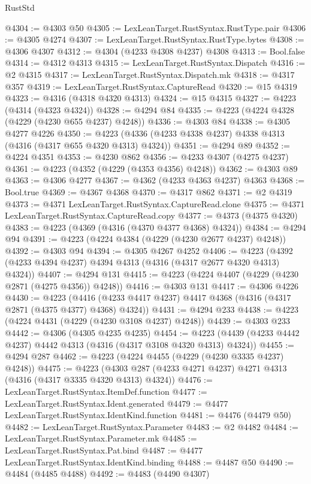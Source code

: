 \begin{lexlean}{RustStd}
\begin{coremodule}
@4304 := @4303 @50
@4305 := LexLeanTarget.RustSyntax.RustType.pair
@4306 := @4305 @4274
@4307 := LexLeanTarget.RustSyntax.RustType.bytes
@4308 := @4306 @4307
@4312 := @4304 (@4233 @4308 @4237) @4308
@4313 := Bool.false
@4314 := @4312 @4313
@4315 := LexLeanTarget.RustSyntax.Dispatch
@4316 := @2 @4315
@4317 := LexLeanTarget.RustSyntax.Dispatch.mk
@4318 := @4317 @357
@4319 := LexLeanTarget.RustSyntax.CaptureRead
@4320 := @15 @4319
@4323 := @4316 (@4318 @4320 @4313)
@4324 := @15 @4315
@4327 := @4223 (@4314 (@4323 @4324))
@4328 := @4294 @84
@4335 := @4223 (@4224 @4328 (@4229 (@4230 @655 @4237) @4248))
@4336 := @4303 @84
@4338 := @4305 @4277 @4226
@4350 := @4223 (@4336 (@4233 @4338 @4237) @4338 @4313 (@4316 (@4317 @655 @4320 @4313) @4324))
@4351 := @4294 @89
@4352 := @4224 @4351
@4353 := @4230 @862
@4356 := @4233 @4307 (@4275 @4237)
@4361 := @4223 (@4352 (@4229 (@4353 @4356) @4248))
@4362 := @4303 @89
@4363 := @4306 @4277
@4367 := @4362 (@4233 @4363 @4237) @4363
@4368 := Bool.true
@4369 := @4367 @4368
@4370 := @4317 @862
@4371 := @2 @4319
@4373 := @4371 LexLeanTarget.RustSyntax.CaptureRead.clone
@4375 := @4371 LexLeanTarget.RustSyntax.CaptureRead.copy
@4377 := @4373 (@4375 @4320)
@4383 := @4223 (@4369 (@4316 (@4370 @4377 @4368) @4324))
@4384 := @4294 @94
@4391 := @4223 (@4224 @4384 (@4229 (@4230 @2677 @4237) @4248))
@4392 := @4303 @94
@4394 := @4305 @4267 @4252
@4406 := @4223 (@4392 (@4233 @4394 @4237) @4394 @4313 (@4316 (@4317 @2677 @4320 @4313) @4324))
@4407 := @4294 @131
@4415 := @4223 (@4224 @4407 (@4229 (@4230 @2871 (@4275 @4356)) @4248))
@4416 := @4303 @131
@4417 := @4306 @4226
@4430 := @4223
    (@4416 (@4233 @4417 @4237) @4417 @4368 (@4316 (@4317 @2871 (@4375 @4377) @4368) @4324))
@4431 := @4294 @233
@4438 := @4223 (@4224 @4431 (@4229 (@4230 @3108 @4237) @4248))
@4439 := @4303 @233
@4442 := @4306 (@4305 @4235 @4235)
@4454 := @4223 (@4439 (@4233 @4442 @4237) @4442 @4313 (@4316 (@4317 @3108 @4320 @4313) @4324))
@4455 := @4294 @287
@4462 := @4223 (@4224 @4455 (@4229 (@4230 @3335 @4237) @4248))
@4475 := @4223 (@4303 @287 (@4233 @4271 @4237) @4271 @4313 (@4316 (@4317 @3335 @4320 @4313) @4324))
@4476 := LexLeanTarget.RustSyntax.ItemDef.function
@4477 := LexLeanTarget.RustSyntax.Ident.generated
@4479 := @4477 LexLeanTarget.RustSyntax.IdentKind.function
@4481 := @4476 (@4479 @50)
@4482 := LexLeanTarget.RustSyntax.Parameter
@4483 := @2 @4482
@4484 := LexLeanTarget.RustSyntax.Parameter.mk
@4485 := LexLeanTarget.RustSyntax.Pat.bind
@4487 := @4477 LexLeanTarget.RustSyntax.IdentKind.binding
@4488 := @4487 @50
@4490 := @4484 (@4485 @4488)
@4492 := @4483 (@4490 @4307)

\end{coremodule}
\end{lexlean}
